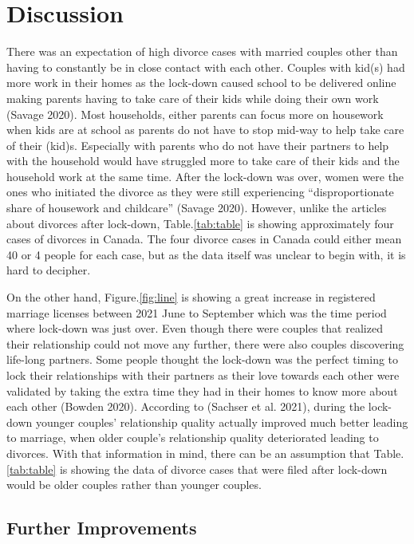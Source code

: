 \documentclass[
]{article}
\begin{document}
\hypertarget{discussion}{%
\section{Discussion}\label{discussion}}

There was an expectation of high divorce cases with married couples other than having to constantly be in close contact with each other. Couples with kid(s) had more work in their homes as the lock-down caused school to be delivered online making parents having to take care of their kids while doing their own work (Savage 2020). Most households, either parents can focus more on housework when kids are at school as parents do not have to stop mid-way to help take care of their (kid)s. Especially with parents who do not have their partners to help with the household would have struggled more to take care of their kids and the household work at the same time. After the lock-down was over, women were the ones who initiated the divorce as they were still experiencing ``disproportionate share of housework and childcare'' (Savage 2020). However, unlike the articles about divorces after lock-down, Table.\ref{tab:table} is showing approximately four cases of divorces in Canada. The four divorce cases in Canada could either mean 40 or 4 people for each case, but as the data itself was unclear to begin with, it is hard to decipher.

On the other hand, Figure.\ref{fig:line} is showing a great increase in registered marriage licenses between 2021 June to September which was the time period where lock-down was just over. Even though there were couples that realized their relationship could not move any further, there were also couples discovering life-long partners. Some people thought the lock-down was the perfect timing to lock their relationships with their partners as their love towards each other were validated by taking the extra time they had in their homes to know more about each other (Bowden 2020). According to (Sachser et al. 2021), during the lock-down younger couples' relationship quality actually improved much better leading to marriage, when older couple's relationship quality deteriorated leading to divorces. With that information in mind, there can be an assumption that Table.\ref{tab:table} is showing the data of divorce cases that were filed after lock-down would be older couples rather than younger couples.

\hypertarget{further-improvements}{%
\subsection{Further Improvements}\label{further-improvements}}
\end{document}

